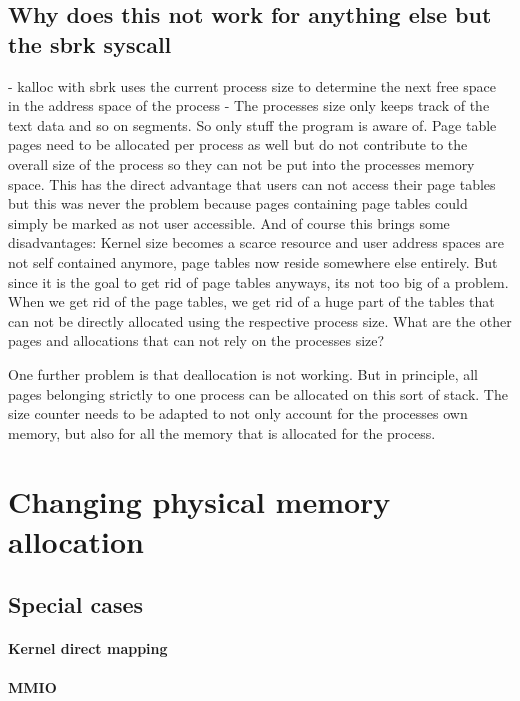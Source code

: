 \subsection*{Why does this not work for anything else but the sbrk syscall}
- kalloc with sbrk uses the current process size to determine the next free space in
the address space of the process
- The processes size only keeps track of the text data and so on segments. So only stuff
the program is aware of. Page table pages need to be allocated per process as well but
do not contribute to the overall size of the process so they can not be put into the
processes memory space. This has the direct advantage that users can not access their page tables
but this was never the problem because pages containing page tables could simply be marked
as not user accessible. And of course this brings some disadvantages: Kernel size becomes
a scarce resource and user address spaces are not self contained anymore, page tables now reside
somewhere else entirely.
But since it is the goal to get rid of page tables anyways, its not too big of a problem.
When we get rid of the page tables, we get rid of a huge part of the tables that can not
be directly allocated using the respective process size.
What are the other pages and allocations that can not rely on the processes size?

One further problem is that deallocation is not working. But in principle, all pages belonging
strictly to one process can be allocated on this sort of stack. The size counter
needs to be adapted to not only account for the processes own memory, but also
for all the memory that is allocated for the process.
\section{Changing physical memory allocation}
\subsection{Special cases}
\paragraph*{Kernel direct mapping}
\paragraph*{MMIO}
